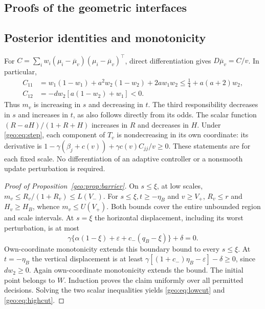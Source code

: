 \subsection{Proofs of the geometric interfaces}
\subsection{Posterior identities and monotonicity}
For $C=\sum_iw_i(\mu_i-\overline\mu_v)(\mu_i-\overline\mu_v)^\top$, direct differentiation gives
$D\overline\mu_v=C/v$. In particular,
\begin{align}
 C_{11}&=w_1(1-w_1)+a^2w_2(1-w_2)+2aw_1w_2
 \le\tfrac14+a(a+2)w_2,\label{geo:eq:C11}\\
 C_{12}&=-dw_2[a(1-w_2)+w_1]<0.\label{geo:eq:C12}
\end{align}
Thus $m_v$ is increasing in $s$ and decreasing in $t$. The third responsibility
decreases in $s$ and increases in $t$, as also follows directly from its odds.
The scalar function $(R-aH)/(1+R+H)$ increases in $R$ and decreases in $H$.
Under \eqref{geo:eq:step}, each component of $T_v$ is nondecreasing in its own
coordinate: its derivative is
$1-\gamma(\beta_j+c(v))+\gamma c(v)C_{jj}/v\ge0$.
These statements are for each fixed scale. No differentiation of an adaptive
controller or a nonsmooth update perturbation is required.

\begin{proof}[Proof of Proposition~\ref{geo:prop:barrier}]
On $s\le\xi$, at low scales,
$m_v\le R_v/(1+R_v)\le L(V_-)$. For $s\le\xi,t\ge-\eta_B$ and
$v\ge V_+$, $R_v\le r$ and $H_v\ge H_B$, whence $m_v\le U(V_+)$.
Both bounds cover the entire unbounded region and scale intervals.
At $s=\xi$ the horizontal displacement, including its worst perturbation, is
at most
\[
 \gamma\{\alpha(1-\xi)+\varepsilon+c_-(q_B-\xi)\}+\delta=0.
\]
Own-coordinate monotonicity extends this boundary bound to every $s\le\xi$.
At $t=-\eta_B$ the vertical displacement is at least
$\gamma[(1+c_-)\eta_B-\varepsilon]-\delta\ge0$, since $dw_2\ge0$.
Again own-coordinate monotonicity extends the bound. The initial point belongs
to $W$. Induction proves the claim uniformly over all permitted decisions.
Solving the two scalar inequalities yields \eqref{geo:eq:lowcut} and
\eqref{geo:eq:highcut}.
\end{proof}

